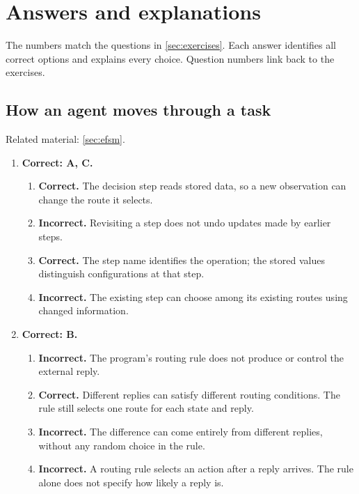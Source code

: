\section{Answers and explanations}
\label{sec:exercise-answers}

The numbers match the questions in \cref{sec:exercises}. Each answer identifies all correct
options and explains every choice. Question numbers link back to the exercises.

\subsection{How an agent moves through a task}
\noindent Related material: \cref{sec:efsm}.

\begin{enumerate}[start=1,itemsep=0.7\baselineskip]
\item[{\hyperref[exercise:1]{1.}}] \begin{minipage}[t]{\linewidth}
\textbf{Correct: A, C.}
\begin{enumerate}[label=\textnormal{(\Alph*)},leftmargin=*,itemsep=0pt]
\item \textbf{Correct.} The decision step reads stored data, so a new observation can change the route it selects.
\item \textbf{Incorrect.} Revisiting a step does not undo updates made by earlier steps.
\item \textbf{Correct.} The step name identifies the operation; the stored values distinguish configurations at that step.
\item \textbf{Incorrect.} The existing step can choose among its existing routes using changed information.
\end{enumerate}
\end{minipage}

\item[{\hyperref[exercise:2]{2.}}] \begin{minipage}[t]{\linewidth}
\textbf{Correct: B.}
\begin{enumerate}[label=\textnormal{(\Alph*)},leftmargin=*,itemsep=0pt]
\item \textbf{Incorrect.} The program's routing rule does not produce or control the external reply.
\item \textbf{Correct.} Different replies can satisfy different routing conditions. The rule still selects one route for each state and reply.
\item \textbf{Incorrect.} The difference can come entirely from different replies, without any random choice in the rule.
\item \textbf{Incorrect.} A routing rule selects an action after a reply arrives. The rule alone does not specify how likely a reply is.
\end{enumerate}
\end{minipage}


\end{enumerate}
